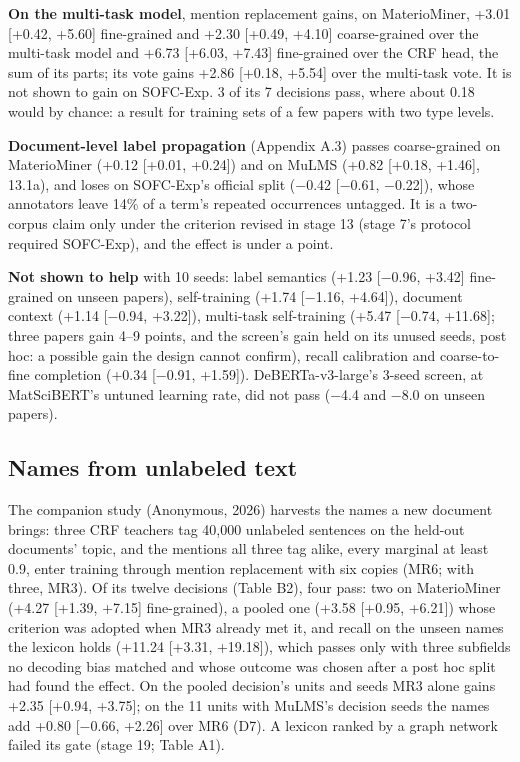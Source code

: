 \documentclass[11pt,a4paper]{article}
\begin{document}
\textbf{On the multi-task model}, mention replacement gains, on MaterioMiner,
+3.01 {[}+0.42, +5.60{]} fine-grained and +2.30 {[}+0.49, +4.10{]} coarse-grained
over the multi-task model and +6.73 {[}+6.03, +7.43{]} fine-grained over the
CRF head, the sum of its parts; its vote gains +2.86 {[}+0.18, +5.54{]} over
the multi-task vote. It is not shown to gain on SOFC-Exp. 3 of its 7 decisions
pass, where about 0.18 would by chance: a result for training sets of a
few papers with two type levels.

\textbf{Document-level label propagation} (Appendix A.3) passes coarse-grained
on MaterioMiner (+0.12 {[}+0.01, +0.24{]}) and on MuLMS (+0.82 {[}+0.18, +1.46{]},
13.1a), and loses on SOFC-Exp's official split (−0.42 {[}−0.61, −0.22{]}),
whose annotators leave 14\% of a term's repeated occurrences untagged. It
is a two-corpus claim only under the criterion revised in stage 13 (stage
7's protocol required SOFC-Exp), and the effect is under a point.

\textbf{Not shown to help} with 10 seeds: label semantics (+1.23 {[}−0.96, +3.42{]}
fine-grained on unseen papers), self-training (+1.74 {[}−1.16, +4.64{]}),
document context (+1.14 {[}−0.94, +3.22{]}), multi-task self-training (+5.47
{[}−0.74, +11.68{]}; three papers gain 4--9 points, and the screen's gain held
on its unused seeds, post hoc: a possible gain the design cannot confirm),
recall calibration and coarse-to-fine completion (+0.34 {[}−0.91,
+1.59{]}). DeBERTa-v3-large's 3-seed screen, at MatSciBERT's untuned
learning rate, did not pass (−4.4 and −8.0 on unseen papers).

\hypertarget{names-from-unlabeled-text}{%
\subsection{Names from unlabeled text}\label{names-from-unlabeled-text}}

The companion study (Anonymous, 2026) harvests the names a new document
brings: three CRF teachers tag 40,000 unlabeled sentences on the held-out
documents' topic, and the mentions all three tag alike, every marginal at
least 0.9, enter training through mention replacement with six copies
(MR6; with three, MR3). Of its twelve decisions (Table B2), four pass: two
on MaterioMiner (+4.27 {[}+1.39, +7.15{]} fine-grained), a pooled one (+3.58
{[}+0.95, +6.21{]}) whose criterion was adopted when MR3 already met it, and
recall on the unseen names the lexicon holds (+11.24 {[}+3.31, +19.18{]}),
which passes only with three subfields no decoding bias matched and whose
outcome was chosen after a post hoc split had found the effect. On the
pooled decision's units and seeds MR3 alone gains +2.35 {[}+0.94, +3.75{]}; on
the 11 units with MuLMS's decision seeds the names add +0.80 {[}−0.66,
+2.26{]} over MR6 (D7). A lexicon ranked by a graph network failed its gate
(stage 19; Table A1).
\end{document}
